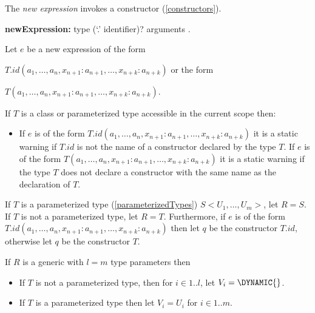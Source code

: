 \documentclass{article}
\begin{document}
\LMHash{}
The {\em new expression} invokes a constructor (\ref{constructors}).

\begin{grammar}
{\bf newExpression:}
\NEW{} type (`{\escapegrammar .}' identifier)? arguments
.
\end{grammar}

\LMHash{}
Let $e$ be a new expression of the form  

\NEW{} $T.id(a_1, \ldots , a_n, x_{n+1}: a_{n+1}, \ldots , x_{n+k}: a_{n+k})$ or the form  

\NEW{} $T(a_1, \ldots , a_n, x_{n+1}: a_{n+1}, \ldots , x_{n+k}: a_{n+k})$. 



\LMHash{}
If $T$ is  a class or parameterized type accessible in the current scope then:
\begin{itemize}
\item
If $e$ is of the form \NEW{} $T.id(a_1, \ldots , a_n, x_{n+1}: a_{n+1}, \ldots , x_{n+k}: a_{n+k})$ it is a static warning if $T.id$ is not the name of a constructor declared by the type $T$. If $e$ is of the form  \NEW{} $T(a_1, \ldots , a_n, x_{n+1}: a_{n+1}, \ldots , x_{n+k}: a_{n+k})$ it is a static warning if the type $T$ does not declare a constructor with the same name as the declaration of $T$. 
\end{itemize}

\LMHash{}
If $T$ is a parameterized type (\ref{parameterizedTypes}) $S<U_1,  \ldots, U_m>$, let $R = S$.  
If $T$ is not a parameterized type, let $R = T$.
Furthermore, if $e$ is of the form \NEW{} $T.id(a_1, \ldots , a_n, x_{n+1}: a_{n+1}, \ldots , x_{n+k}: a_{n+k})$ then let  $q$ be the constructor  $T.id$, otherwise let $q$ be the constructor $T$. 

\LMHash{}
If $R$ is a generic with $l = m$ type parameters then
\begin{itemize}
\item  If $T$ is not a parameterized type, then for $ i \in 1 .. l$, let $V_i =  \DYNAMIC{}$.
\item  If $T$ is  a parameterized type then let $V_i = U_i$ for $ i \in 1 .. m$.  
\end{itemize}
\end{document}
